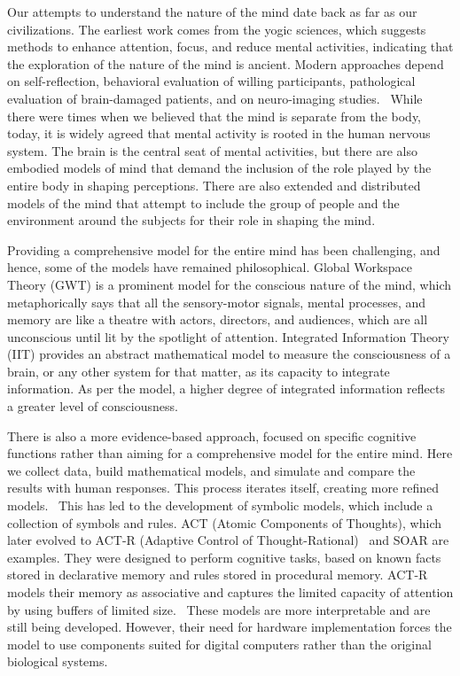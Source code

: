 \documentclass[reprint,amsmath,amssymb,apr,aip,onecolumn, 11pt]{revtex4-1}
\begin{document}
	Our attempts to understand the nature of the mind date back as far as our civilizations. The earliest work comes from the yogic sciences, which suggests methods to enhance attention, focus, and reduce mental activities, indicating that the exploration of the nature of the mind is ancient\cite{Vivekananda_1896}. Modern approaches depend on self-reflection, behavioral evaluation of willing participants, pathological evaluation of brain-damaged patients, and on neuro-imaging studies.  While there were times when we believed that the mind is separate from the body, today, it is widely agreed that mental activity is rooted in the human nervous system. The brain is the central seat of mental activities, but there are also embodied models of mind that demand the inclusion of the role played by the entire body in shaping perceptions. There are also extended and distributed models of the mind that attempt to include the group of people and the environment around the subjects for their role in shaping the mind. 
	
	Providing a comprehensive model for the entire mind has been challenging, and hence, some of the models have remained philosophical. Global Workspace Theory (GWT) is a prominent model for the conscious nature of the mind, which metaphorically says that all the sensory-motor signals, mental processes, and memory are like a theatre with actors, directors, and audiences, which are all unconscious until lit by the spotlight of attention\cite{ Baars1988-BAAACT}. Integrated Information Theory (IIT) provides an abstract mathematical model to measure the consciousness of a brain, or any other system for that matter, as its capacity to integrate information\cite{ Tononi_2004_IIT}. As per the model, a higher degree of integrated information reflects a greater level of consciousness. 
	
	There is also a more evidence-based approach, focused on specific cognitive functions rather than aiming for a comprehensive model for the entire mind. Here we collect data, build mathematical models, and simulate and compare the results with human responses. This process iterates itself, creating more refined models.  This has led to the development of symbolic models, which include a collection of symbols and rules. ACT (Atomic Components of Thoughts), which later evolved to ACT-R (Adaptive Control of Thought-Rational)\cite{Anderson_1974, Anderson_1998}  and SOAR\cite{Newell_1990} are examples. They were designed to perform cognitive tasks, based on known facts stored in declarative memory and rules stored in procedural memory. ACT-R models their memory as associative and captures the limited capacity of attention by using buffers of limited size.  These models are more interpretable and are still being developed. However, their need for hardware implementation forces the model to use components suited for digital computers rather than the original biological systems.  
	
\end{document}

